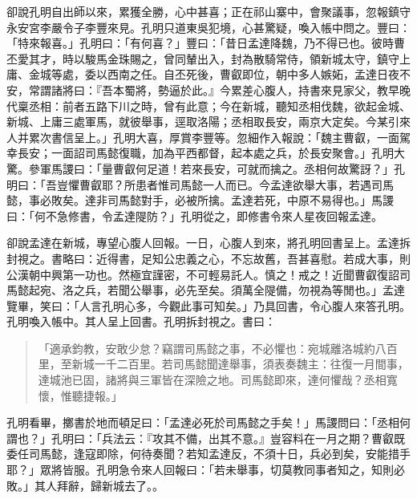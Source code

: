 卻說孔明自出師以來，累獲全勝，心中甚喜；正在祁山寨中，會聚議事，忽報鎮守永安宮李嚴令子李豐來見。孔明只道東吳犯境，心甚驚疑，喚入帳中問之。豐曰：「特來報喜。」孔明曰：「有何喜？」豐曰：「昔日孟達降魏，乃不得已也。彼時曹丕愛其才，時以駿馬金珠賜之，曾同輦出入，封為散騎常侍，領新城太守，鎮守上庸、金城等處，委以西南之任。自丕死後，曹叡即位，朝中多人嫉妬，孟達日夜不安，常謂諸將曰：『吾本蜀將，勢逼於此。』今累差心腹人，持書來見家父，教早晚代稟丞相：前者五路下川之時，曾有此意；今在新城，聽知丞相伐魏，欲起金城、新城、上庸三處軍馬，就彼舉事，逕取洛陽；丞相取長安，兩京大定矣。今某引來人并累次書信呈上。」孔明大喜，厚賞李豐等。忽細作入報說：「魏主曹叡，一面駕幸長安；一面詔司馬懿復職，加為平西都督，起本處之兵，於長安聚會。」孔明大驚。參軍馬謖曰：「量曹叡何足道！若來長安，可就而擒之。丞相何故驚訝？」孔明曰：「吾豈懼曹叡耶？所患者惟司馬懿一人而已。今孟達欲舉大事，若遇司馬懿，事必敗矣。達非司馬懿對手，必被所擒。孟達若死，中原不易得也。」馬謖曰：「何不急修書，令孟達隄防？」孔明從之，即修書令來人星夜回報孟達。

卻說孟達在新城，專望心腹人回報。一日，心腹人到來，將孔明回書呈上。孟達拆封視之。書略曰：近得書，足知公忠義之心，不忘故舊，吾甚喜慰。若成大事，則公漢朝中興第一功也。然極宜謹密，不可輕易託人。慎之！戒之！近聞曹叡復詔司馬懿起宛、洛之兵，若聞公舉事，必先至矣。須萬全隄備，勿視為等閒也。」孟達覽畢，笑曰：「人言孔明心多，今觀此事可知矣。」乃具回書，令心腹人來答孔明。孔明喚入帳中。其人呈上回書。孔明拆封視之。書曰：

\begin{quote}
「適承鈞教，安敢少怠？竊謂司馬懿之事，不必懼也：宛城離洛城約八百里，至新城一千二百里。若司馬懿聞達舉事，須表奏魏主：往復一月間事，達城池已固，諸將與三軍皆在深險之地。司馬懿即來，達何懼哉？丞相寬懷，惟聽捷報。」
\end{quote}

孔明看畢，擲書於地而頓足曰：「孟達必死於司馬懿之手矣！」馬謖問曰：「丞相何謂也？」孔明曰：「兵法云：『攻其不備，出其不意。』豈容料在一月之期？曹叡既委任司馬懿，逢寇即除，何待奏聞？若知孟達反，不須十日，兵必到矣，安能措手耶？」眾將皆服。孔明急令來人回報曰：「若未舉事，切莫教同事者知之，知則必敗。」其人拜辭，歸新城去了。。

